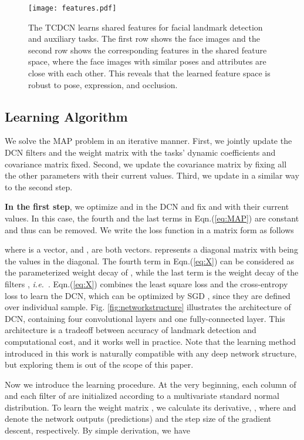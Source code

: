 \documentclass[10pt,journal,compsoc]{IEEEtran}
\newcommand{\ie}{\emph{i.e.}~}
\begin{document}
\begin{figure*}[t]
  \centering
  \texttt{[image: features.pdf]}\\
  \vskip -0.3cm
  \caption{The TCDCN learns shared features for facial landmark detection and auxiliary tasks. The first row shows the face images and the second row shows the corresponding features in the shared feature space, where the face images with similar poses and attributes are close with each other. This reveals that the learned feature space is robust to pose, expression, and occlusion.
}\label{fig:features}
\end{figure*}
\subsection{Learning Algorithm}
\label{sec:learningnetwork}


We solve the MAP problem in an iterative manner. First, we jointly update the DCN filters  and the weight matrix  with the tasks' dynamic coefficients  and covariance matrix  fixed.
Second, we update the covariance matrix  by fixing all the other parameters with their current values.
Third, we update  in a similar way to the second step.

\vspace{0.1cm}
\textbf{In the first step}, we optimize  and  in the DCN and fix  and  with their current values. In this case, the fourth and the last terms in Eqn.(\ref{eq:MAP}) are constant and thus can be removed. We write the loss function in a matrix form as follows

where  is a  vector, and ,  are both  vectors.  represents a diagonal matrix with  being the values in the diagonal.
The fourth term in Eqn.(\ref{eq:X}) can be considered as the parameterized weight decay of , while the last term is the weight decay of the filters , \ie .
Eqn.(\ref{eq:X}) combines the least square loss and the cross-entropy loss to learn the DCN, which can be optimized by SGD \cite{krizhevsky2012imagenet}, since they are defined over individual sample.
Fig. \ref{fig:networkstructure} illustrates the architecture of DCN, containing four convolutional layers and one fully-connected layer. This architecture is a tradeoff between accuracy of landmark detection and computational cost, and it works well in practice. Note that the learning method introduced in this work is naturally compatible with any deep network structure, but exploring them is out of the scope of this paper.

Now we introduce the learning procedure. At the very beginning, each column of  and each filter of  are initialized according to a multivariate standard normal distribution. To learn the weight matrix , we calculate its derivative, , where  and  denote the network outputs (predictions) and the step size of the gradient descent, respectively. By simple derivation, we have
\end{document}
